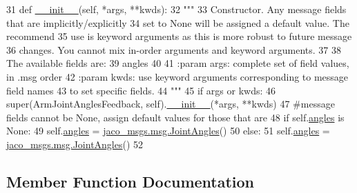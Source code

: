 \begin{DoxyCode}
31   \textcolor{keyword}{def }\hyperlink{classjaco__msgs_1_1msg_1_1__ArmJointAnglesFeedback_1_1ArmJointAnglesFeedback_a02a9d8b7dda450028c6223b15a5b738d}{\_\_init\_\_}(self, *args, **kwds):
32     \textcolor{stringliteral}{"""}
33 \textcolor{stringliteral}{    Constructor. Any message fields that are implicitly/explicitly}
34 \textcolor{stringliteral}{    set to None will be assigned a default value. The recommend}
35 \textcolor{stringliteral}{    use is keyword arguments as this is more robust to future message}
36 \textcolor{stringliteral}{    changes.  You cannot mix in-order arguments and keyword arguments.}
37 \textcolor{stringliteral}{}
38 \textcolor{stringliteral}{    The available fields are:}
39 \textcolor{stringliteral}{       angles}
40 \textcolor{stringliteral}{}
41 \textcolor{stringliteral}{    :param args: complete set of field values, in .msg order}
42 \textcolor{stringliteral}{    :param kwds: use keyword arguments corresponding to message field names}
43 \textcolor{stringliteral}{    to set specific fields.}
44 \textcolor{stringliteral}{    """}
45     \textcolor{keywordflow}{if} args \textcolor{keywordflow}{or} kwds:
46       super(ArmJointAnglesFeedback, self).\hyperlink{classjaco__msgs_1_1msg_1_1__ArmJointAnglesFeedback_1_1ArmJointAnglesFeedback_a02a9d8b7dda450028c6223b15a5b738d}{\_\_init\_\_}(*args, **kwds)
47       \textcolor{comment}{#message fields cannot be None, assign default values for those that are}
48       \textcolor{keywordflow}{if} self.\hyperlink{classjaco__msgs_1_1msg_1_1__ArmJointAnglesFeedback_1_1ArmJointAnglesFeedback_a831195e05399bc94228e21684caadea0}{angles} \textcolor{keywordflow}{is} \textcolor{keywordtype}{None}:
49         self.\hyperlink{classjaco__msgs_1_1msg_1_1__ArmJointAnglesFeedback_1_1ArmJointAnglesFeedback_a831195e05399bc94228e21684caadea0}{angles} = \hyperlink{classjaco__msgs_1_1msg_1_1__JointAngles_1_1JointAngles}{jaco\_msgs.msg.JointAngles}()
50     \textcolor{keywordflow}{else}:
51       self.\hyperlink{classjaco__msgs_1_1msg_1_1__ArmJointAnglesFeedback_1_1ArmJointAnglesFeedback_a831195e05399bc94228e21684caadea0}{angles} = \hyperlink{classjaco__msgs_1_1msg_1_1__JointAngles_1_1JointAngles}{jaco\_msgs.msg.JointAngles}()
52 
\end{DoxyCode}


\subsection{Member Function Documentation}
